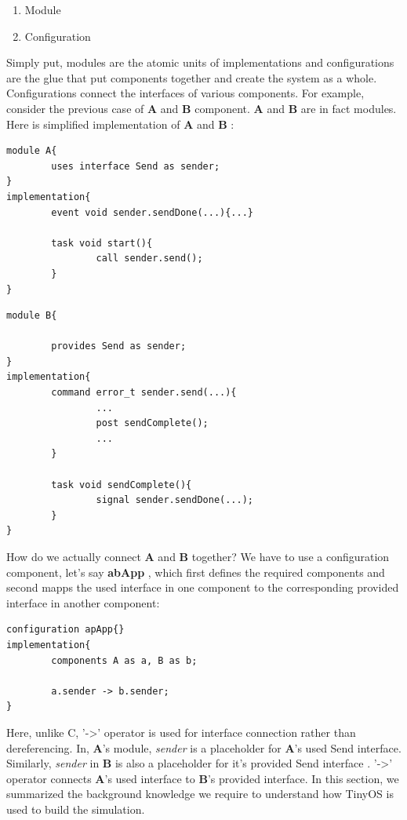 \documentclass[11pt, titlepage, oneside]{article}
\begin{document}
\begin{enumerate} 
\item Module  
\item  Configuration
\end{enumerate} 
 
Simply put, modules are the atomic units of implementations and configurations are the glue that put components together and create the system as a whole. Configurations connect the interfaces of various components. For example, consider the previous case of {\bf A} and {\bf B}  component. {\bf A} and {\bf B}  are in fact modules. Here is simplified implementation of {\bf A} and {\bf B} : 

\begin{lstlisting}[label=some-code,caption=Module A.nesc] 
module A{ 
        uses interface Send as sender; 
} 
implementation{ 
        event void sender.sendDone(...){...} 
 
        task void start(){ 
                call sender.send(); 
        } 
} 
\end{lstlisting} 
 
\begin{lstlisting}[label=some-code,caption=Module B.nesc] 
module B{ 
 
        provides Send as sender; 
} 
implementation{ 
        command error_t sender.send(...){ 
                ... 
                post sendComplete(); 
                ... 
        } 
 
        task void sendComplete(){ 
                signal sender.sendDone(...); 
        } 
} 
\end{lstlisting} 
How do we actually connect {\bf A}  and {\bf B}  together? We have to use a configuration component, let's say {\bf abApp} , which first defines the required components and second mapps the used interface in one component to the corresponding provided interface in another component: 
 
\begin{lstlisting}[label=some-code,caption=Configuration asApp.nesc] 
configuration apApp{} 
implementation{ 
        components A as a, B as b; 
         
        a.sender -> b.sender; 
} 
\end{lstlisting} 
 
 
 
Here, unlike C, '-\textgreater' operator is used for interface connection rather than dereferencing. In, {\bf A}'s module, {\it sender} is a placeholder for {\bf A}'s used Send interface. Similarly, {\it sender} in {\bf B} is also a placeholder for it's provided Send interface . '-\textgreater' operator connects {\bf A}'s used interface to {\bf B}'s provided interface. In this section, we summarized the background knowledge we require to understand how TinyOS is used to build the simulation. 
 
\end{document}
